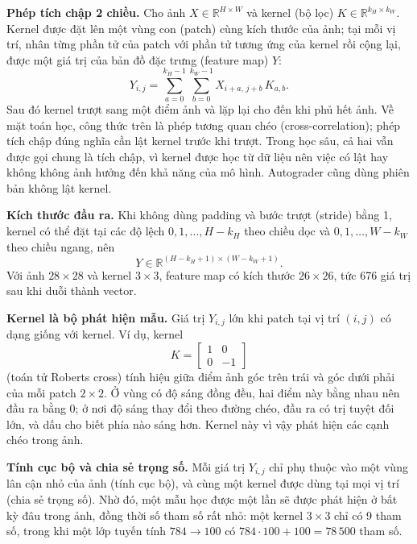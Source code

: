 \textbf{Phép tích chập 2 chiều.} Cho ảnh $X \in \mathbb{R}^{H \times W}$ và
kernel (bộ lọc) $K \in \mathbb{R}^{k_H \times k_W}$. Kernel được đặt lên một
vùng con (patch) cùng kích thước của ảnh; tại mỗi vị trí, nhân từng phần tử
của patch với phần tử tương ứng của kernel rồi cộng lại, được một giá trị
của bản đồ đặc trưng (feature map) $Y$:
\begin{equation}
Y_{i,j} = \sum_{a=0}^{k_H-1} \sum_{b=0}^{k_W-1} X_{i+a,\, j+b}\, K_{a,b}.
\label{eq:q5_conv}
\end{equation}
Sau đó kernel trượt sang một điểm ảnh và lặp lại cho đến khi phủ hết ảnh.
Về mặt toán học, công thức trên là phép tương quan chéo (cross-correlation);
phép tích chập đúng nghĩa cần lật kernel trước khi trượt. Trong học sâu, cả
hai vẫn được gọi chung là tích chập, vì kernel được học từ dữ liệu nên việc
có lật hay không không ảnh hưởng đến khả năng của mô hình. Autograder cũng
dùng phiên bản không lật kernel.

\textbf{Kích thước đầu ra.} Khi không dùng padding và bước trượt (stride)
bằng 1, kernel có thể đặt tại các độ lệch $0, 1, \dots, H - k_H$ theo chiều
dọc và $0, 1, \dots, W - k_W$ theo chiều ngang, nên
\begin{equation}
Y \in \mathbb{R}^{(H - k_H + 1) \times (W - k_W + 1)}.
\label{eq:q5_shape}
\end{equation}
Với ảnh $28 \times 28$ và kernel $3 \times 3$, feature map có kích thước
$26 \times 26$, tức 676 giá trị sau khi duỗi thành vector.

\textbf{Kernel là bộ phát hiện mẫu.} Giá trị $Y_{i,j}$ lớn khi patch tại vị
trí $(i, j)$ có dạng giống với kernel. Ví dụ, kernel
\begin{equation}
K = \begin{bmatrix} 1 & 0 \\ 0 & -1 \end{bmatrix}
\end{equation}
(toán tử Roberts cross) tính hiệu giữa điểm ảnh góc trên trái và góc dưới
phải của mỗi patch $2 \times 2$. Ở vùng có độ sáng đồng đều, hai điểm này
bằng nhau nên đầu ra bằng 0; ở nơi độ sáng thay đổi theo đường chéo, đầu ra
có trị tuyệt đối lớn, và dấu cho biết phía nào sáng hơn. Kernel này vì vậy
phát hiện các cạnh chéo trong ảnh.

\textbf{Tính cục bộ và chia sẻ trọng số.} Mỗi giá trị $Y_{i,j}$ chỉ phụ thuộc
vào một vùng lân cận nhỏ của ảnh (tính cục bộ), và cùng một kernel được dùng
tại mọi vị trí (chia sẻ trọng số). Nhờ đó, một mẫu học được một lần sẽ được
phát hiện ở bất kỳ đâu trong ảnh, đồng thời số tham số rất nhỏ: một kernel
$3 \times 3$ chỉ có 9 tham số, trong khi một lớp tuyến tính
$784 \rightarrow 100$ có $784 \cdot 100 + 100 = 78\,500$ tham số.

